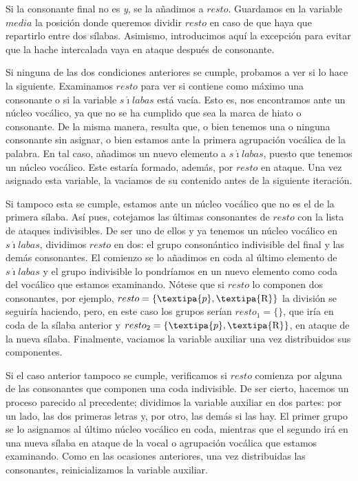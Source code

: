 Si la consonante final no es \textit{y}, se la añadimos a $resto$. Guardamos en la variable $media$ la posición donde queremos dividir $resto$ en caso de que haya que repartirlo entre dos sílabas. Asimismo, introducimos aquí la excepción para evitar que la hache intercalada vaya en ataque después de consonante.

Si ninguna de las dos condiciones anteriores se cumple, probamos a ver si lo hace la siguiente. Examinamos $resto$ para ver si contiene como máximo una consonante o si la variable $s\acute{\imath}labas$ está vacía. Esto  es, nos encontramos ante un núcleo vocálico, ya que no se ha cumplido que sea la marca de hiato o consonante. De la misma manera, resulta que, o bien tenemos una o ninguna consonante sin asignar, o bien estamos ante la primera agrupación vocálica de la palabra. En tal caso, añadimos un nuevo elemento a $s\acute{\imath}labas$, puesto que tenemos un núcleo vocálico. Este estaría formado, además, por $resto$ en ataque. Una vez asignado esta variable, la vaciamos de su contenido antes de la siguiente iteración.

Si tampoco esta se cumple, estamos ante un núcleo vocálico que no es el de la primera sílaba. Así pues, cotejamos las últimas consonantes de  $resto$ con la lista de ataques indivisibles. De ser uno de ellos y ya tenemos un núcleo vocálico en  $s\acute{\imath}labas$, dividimos $resto$ en dos: el grupo consonántico indivisible del final y las demás consonantes. El comienzo se lo añadimos en coda al último elemento de $s\acute{\imath}labas$ y el grupo indivisible lo pondríamos en un nuevo elemento como coda del vocálico que estamos examinando. Nótese que si $resto$ lo componen dos consonantes, por ejemplo, $resto = \{\textipa{p}, \text{\textipa{R}}\}$ la división se seguiría haciendo, pero, en este caso los grupos serían $resto_{1} = \{\}$, que iría en coda de la sílaba anterior y  $resto_{2} = \{\textipa{p}, \text{\textipa{R}}\}$, en ataque de la nueva sílaba. Finalmente, vaciamos la variable auxiliar una vez distribuidos sus componentes.

Si el caso anterior tampoco se cumple, verificamos si $resto$ comienza por alguna de las consonantes que componen una coda indivisible. De ser cierto, hacemos un proceso parecido al precedente; dividimos la variable auxiliar en dos partes: por un lado, las dos primeras letras y, por otro, las demás si las hay. El primer grupo se lo asignamos al último núcleo vocálico en coda, mientras que el segundo irá en una nueva sílaba en ataque de la vocal o agrupación vocálica que estamos examinando. Como en las ocasiones anteriores, una vez distribuidas las consonantes, reinicializamos la variable auxiliar.

